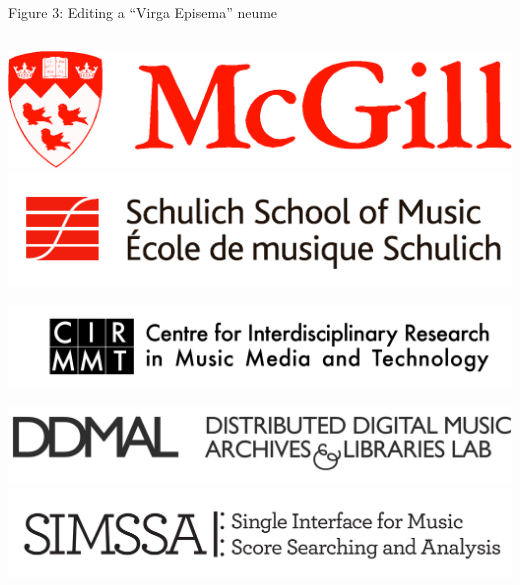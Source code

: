 \documentclass[final]{beamer}
\newlength{\onecolwid}
\newcommand{\blockSpace}{\vskip 0.75ex}
\begin{document}
\begin{frame}[fragile,t]
\begin{columns}
\begin{column}{\onecolwid}
\begin{block}{}
Figure 3: Editing a ``Virga Episema'' neume
\end{block}

\end{column}
\end{columns}


\begin{columns}
\begin{column}{\onecolwid}
\begin{block}{}
\vspace{-2cm}
\centering
\includegraphics[scale=0.2625]{images/McGill_logo}
\hspace{1.2cm} 
\includegraphics[scale=0.75]{images/Schulich_logo}

\vspace{0.75cm}

\includegraphics[scale=0.2625]{images/CIRMMT_logo}

\vspace{0.5cm}

\includegraphics[scale=0.36]{images/ddmal_logo_large}
\includegraphics[scale=1]{images/SIMSSA_logo}


\end{block}
\end{column}
\end{columns}
\end{frame}
\end{document}
